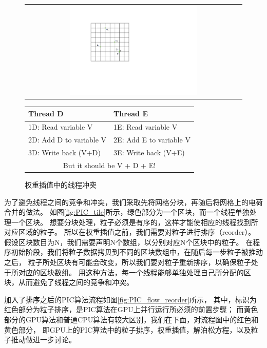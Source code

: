\begin{figure}[!htb]
  \centering
  \begin{tabular}{|l|l|}
    \multicolumn{2}{c}{
    \includegraphics[width=0.6\textwidth]{Img/3PIC_weighting.pdf}} \\
  \end{tabular}
  \begin{tabular}{|l|l|}
    \hline
    Thread D & Thread E  \\
    \hline
    1D: Read variable V     & 1E: Read variable V     \\
    2D: Add D to variable V & 2E: Add E to variable V \\
    3D: Write back (V+D)    & 3E: Write back (V+E)    \\
    \hline
    \multicolumn{2}{c}{But it should be V + D + E!}
  \end{tabular}
  \caption{权重插值中的线程冲突}
  \label{fig:PIC_weighting_threading}
\end{figure}

为了避免线程之间的竞争和冲突，我们采取先将网格分块，再随后将网格上的电荷合并的做法。
如图\ref{fig:PIC_tile}所示，绿色部分为一个区块，而一个线程单独处理一个区块。
想要分块处理，粒子必须是有序的，这样才能使相应的线程找到所对应区域的粒子。
所以在权重插值之前，我们需要对粒子进行排序（reorder）。
假设区块数目为N，我们需要声明N个数组，以分别对应N个区块中的粒子。
在程序初始阶段，我们将粒子数据拷贝到不同的区块数组中，在随后每一步粒子被推动之后，
粒子所处区块有可能会改变，所以我们要对粒子重新排序，以确保粒子处于所对应的区块数组。
用这种方法，每一个线程能够单独处理自己所分配的区块，从而避免了线程之间的竞争和冲突。

加入了排序之后的PIC算法流程如图\ref{fig:PIC_flow_reorder}所示，
其中，标识为红色部分为粒子排序，是PIC算法在GPU上并行运行所必须的前置步骤；
而黄色部分的GPU算法和普通CPU算法有较大区别，我们在下面，对流程图中的红色和黄色部分，
即GPU上的PIC算法中的粒子排序，权重插值，解泊松方程，以及粒子推动做进一步讨论。

